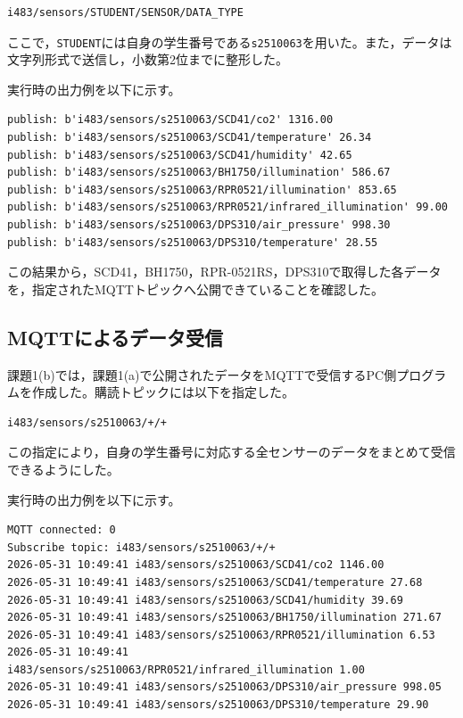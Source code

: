 \documentclass[a4paper,11pt,lualatex,ja=standard]{bxjsarticle}
\begin{document}
\begin{verbatim}
i483/sensors/STUDENT/SENSOR/DATA_TYPE
\end{verbatim}

ここで，\texttt{STUDENT}には自身の学生番号である\texttt{s2510063}を用いた。また，データは文字列形式で送信し，小数第2位までに整形した。

実行時の出力例を以下に示す。

\begin{verbatim}
publish: b'i483/sensors/s2510063/SCD41/co2' 1316.00
publish: b'i483/sensors/s2510063/SCD41/temperature' 26.34
publish: b'i483/sensors/s2510063/SCD41/humidity' 42.65
publish: b'i483/sensors/s2510063/BH1750/illumination' 586.67
publish: b'i483/sensors/s2510063/RPR0521/illumination' 853.65
publish: b'i483/sensors/s2510063/RPR0521/infrared_illumination' 99.00
publish: b'i483/sensors/s2510063/DPS310/air_pressure' 998.30
publish: b'i483/sensors/s2510063/DPS310/temperature' 28.55
\end{verbatim}

この結果から，SCD41，BH1750，RPR-0521RS，DPS310で取得した各データを，指定されたMQTTトピックへ公開できていることを確認した。

\subsection{MQTTによるデータ受信}

課題1(b)では，課題1(a)で公開されたデータをMQTTで受信するPC側プログラムを作成した。購読トピックには以下を指定した。

\begin{verbatim}
i483/sensors/s2510063/+/+
\end{verbatim}

この指定により，自身の学生番号に対応する全センサーのデータをまとめて受信できるようにした。

実行時の出力例を以下に示す。

\begin{verbatim}
MQTT connected: 0
Subscribe topic: i483/sensors/s2510063/+/+
2026-05-31 10:49:41 i483/sensors/s2510063/SCD41/co2 1146.00
2026-05-31 10:49:41 i483/sensors/s2510063/SCD41/temperature 27.68
2026-05-31 10:49:41 i483/sensors/s2510063/SCD41/humidity 39.69
2026-05-31 10:49:41 i483/sensors/s2510063/BH1750/illumination 271.67
2026-05-31 10:49:41 i483/sensors/s2510063/RPR0521/illumination 6.53
2026-05-31 10:49:41 i483/sensors/s2510063/RPR0521/infrared_illumination 1.00
2026-05-31 10:49:41 i483/sensors/s2510063/DPS310/air_pressure 998.05
2026-05-31 10:49:41 i483/sensors/s2510063/DPS310/temperature 29.90
\end{verbatim}
\end{document}
